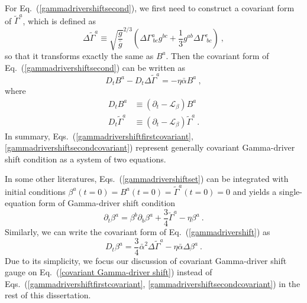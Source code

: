 For Eq.~(\ref{gammadrivershiftsecond}), we first need to construct a covariant form of ${\tilde \Gamma}^{a}$, which is defined as
\begin{equation}
\Delta {\tilde \Gamma}^{a} \equiv \sqrt{\frac{g}{{\bar g}}}^{2/3}\left(\Delta \Gamma^{a}_{~bc}g^{bc} + \frac{1}{3}g^{ab}\Delta \Gamma^{c}_{~bc}\right) \ ,
\end{equation}
so that it transforms exactly the same as $B^{a}$. Then the covariant form of Eq.~(\ref{gammadrivershiftsecond}) can be written as
\begin{equation}\label{gammadrivershiftsecondcovariant}
	D_{t}B^{a} - D_{t}\Delta {\tilde \Gamma}^{a}  = - \eta {\bar \alpha}B^{a} \ , 
\end{equation}
where
\begin{subequations}
\begin{align}
D_{t}B^{a} & \equiv \left(\partial_{t} - \mathcal{L}_{\beta}\right)B^{a}\\
D_{t}{\tilde \Gamma}^{a} & \equiv \left(\partial_{t} - \mathcal{L}_{\beta}\right){\tilde \Gamma}^{a} \ .
\end{align}
\end{subequations}
In summary, Eqs.~(\ref{gammadrivershiftfirstcovariant}, \ref{gammadrivershiftsecondcovariant}) represent generally covariant Gamma-driver shift condition as a system of two equations. 

In some other literatures\cite{vanMeter:2006vi}, Eqs.~(\ref{gammadrivershiftset}) can be integrated with initial conditions $\beta^{a}\left(t=0\right) = B^{a}\left(t=0\right) = {\tilde \Gamma}^{a}\left(t = 0\right) = 0$ and yields a single-equation form of Gamma-driver shift condition
\begin{equation}\label{gammadrivershift}
\partial_{t}\beta^{a} = \beta^{b}\partial_{b}\beta^{a} + \frac{3}{4}{\tilde \Gamma}^{a} - \eta \beta^{a} \ .
\end{equation} 
Similarly, we can write the covariant form of Eq.~(\ref{gammadrivershift}) as
\begin{equation}\label{covariant Gamma-driver shift}
D_{t}\beta^{a} = \frac{3}{4}{\bar \alpha}^{2}\Delta {\tilde \Gamma}^{a} - \eta {\bar \alpha}\Delta\beta^{a} \ .
\end{equation}
Due to its simplicity, we focus our discussion of covariant Gamma-driver shift gauge on Eq.~(\ref{covariant Gamma-driver shift}) instead of Eqs.~(\ref{gammadrivershiftfirstcovariant}, \ref{gammadrivershiftsecondcovariant}) in the rest of this dissertation.


